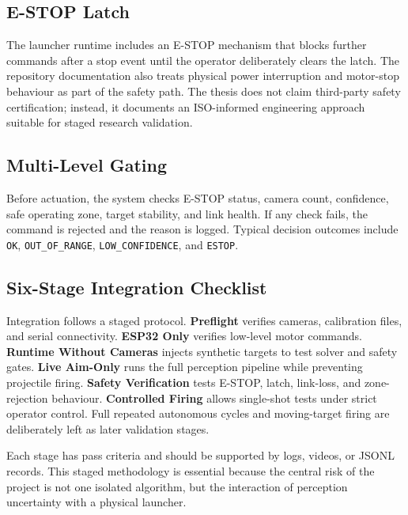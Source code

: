 \subsection{E-STOP Latch}

The launcher runtime includes an E-STOP mechanism that blocks further commands after a stop event until the operator deliberately clears the latch. The repository documentation also treats physical power interruption and motor-stop behaviour as part of the safety path. The thesis does not claim third-party safety certification; instead, it documents an ISO-informed engineering approach suitable for staged research validation.

\subsection{Multi-Level Gating}

Before actuation, the system checks E-STOP status, camera count, confidence, safe operating zone, target stability, and link health. If any check fails, the command is rejected and the reason is logged. Typical decision outcomes include \texttt{OK}, \texttt{OUT\_OF\_RANGE}, \texttt{LOW\_CONFIDENCE}, and \texttt{ESTOP}.

\subsection{Six-Stage Integration Checklist}

Integration follows a staged protocol. \textbf{Preflight} verifies cameras, calibration files, and serial connectivity. \textbf{ESP32 Only} verifies low-level motor commands. \textbf{Runtime Without Cameras} injects synthetic targets to test solver and safety gates. \textbf{Live Aim-Only} runs the full perception pipeline while preventing projectile firing. \textbf{Safety Verification} tests E-STOP, latch, link-loss, and zone-rejection behaviour. \textbf{Controlled Firing} allows single-shot tests under strict operator control. Full repeated autonomous cycles and moving-target firing are deliberately left as later validation stages.

Each stage has pass criteria and should be supported by logs, videos, or JSONL records. This staged methodology is essential because the central risk of the project is not one isolated algorithm, but the interaction of perception uncertainty with a physical launcher.
